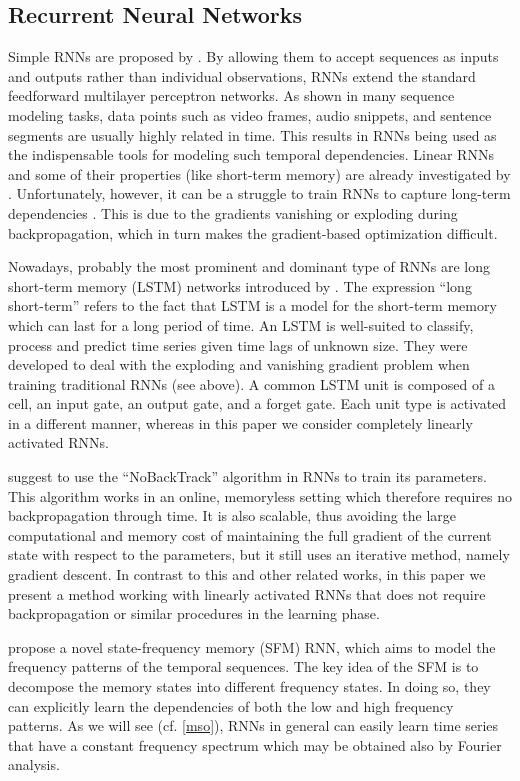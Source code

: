 \documentclass[twoside,11pt]{article}
\theoremstyle{definition}
\begin{document}
\subsection{Recurrent Neural Networks}

Simple RNNs are proposed by \citet{Elm90}. By allowing them to accept sequences
as inputs and outputs rather than individual observations, RNNs extend the
standard feedforward multilayer perceptron networks. As shown in many sequence
modeling tasks, data points such as video frames, audio snippets, and sentence
segments are usually highly related in time. This results in RNNs being used as
the indispensable tools for modeling such temporal dependencies. Linear RNNs and
some of their properties (like short-term memory) are already investigated by
\citet{WLS94}. Unfortunately, however, it can be a struggle to train RNNs to
capture long-term dependencies \citep{BSF94,PMB13}. This is due to the
gradients vanishing or exploding during backpropagation, which in turn makes the
gradient-based optimization difficult.

Nowadays, probably the most prominent and dominant type of RNNs are long
short-term memory (LSTM) networks introduced by \citet{HS97}. The expression \enquote{long
short-term} refers to the fact that LSTM is a model for the short-term memory
which can last for a long period of time. An LSTM is well-suited to classify,
process and predict time series given time lags of unknown size. They were
developed to deal with the exploding and vanishing gradient problem when
training traditional RNNs (see above). A common LSTM unit is composed of a cell,
an input gate, an output gate, and a forget gate. Each unit type is activated in
a different manner, whereas in this paper we consider completely linearly
activated RNNs.

\citet{OTC15} suggest to use the \enquote{NoBackTrack} algorithm in RNNs to
train its parameters. This algorithm works in an online, memoryless setting
which therefore requires no backpropagation through time. It is also scalable,
thus avoiding the large computational and memory cost of maintaining the full
gradient of the current state with respect to the parameters, but it still uses
an iterative method, namely gradient descent. In contrast to this and other
related works, in this paper we present a method working with linearly activated
RNNs that does not require backpropagation or similar procedures in the learning
phase.

\citet{HQ17} propose a novel state-frequency memory (SFM) RNN,
which aims to model the frequency patterns of the temporal sequences.
The key idea of the SFM is to decompose the memory states into different
frequency states. In doing so, they can explicitly learn the dependencies of
both the low and high frequency patterns. As we will see (cf. \cref{mso}),
RNNs in general can easily learn time series that have a constant frequency
spectrum which may be obtained also by Fourier analysis.
\end{document}
